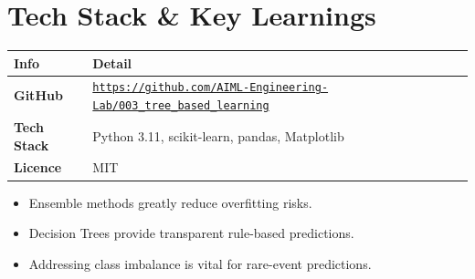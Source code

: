 \documentclass[11pt,a4paper]{article}
\begin{document}
\section{Tech Stack \& Key Learnings}

\begin{tabularx}{\linewidth}{@{}>{\bfseries}l X @{}}
  \arrayrulecolor{tableheader}
  \toprule
  \rowcolor{tableheader} Info & Detail \\
  \midrule
  \rowcolor{white} GitHub & \href{https://github.com/AIML-Engineering-Lab/003_tree_based_learning}{\nolinkurl{https://github.com/AIML-Engineering-Lab/003_tree_based_learning}} \\
  \rowcolor{tablerow} Tech Stack & Python 3.11, scikit-learn, pandas, Matplotlib \\
  \rowcolor{white} Licence & MIT \\
  \bottomrule
\end{tabularx}

\vspace{4pt}
\begin{itemize}[leftmargin=18pt,itemsep=2pt]
  \item Ensemble methods greatly reduce overfitting risks.
  \item Decision Trees provide transparent rule-based predictions.
  \item Addressing class imbalance is vital for rare-event predictions.
\end{itemize}
\end{document}
